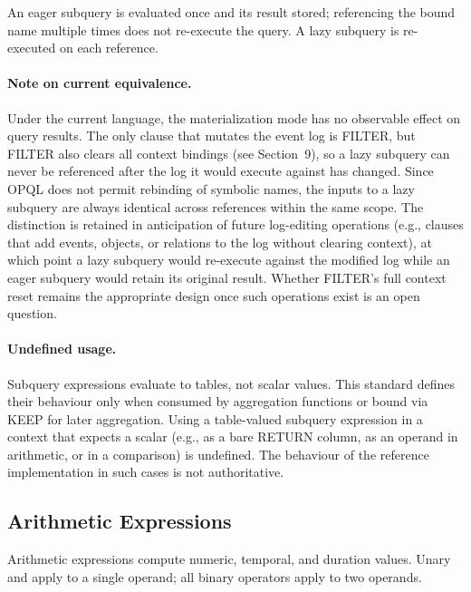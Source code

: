 An eager subquery is evaluated once and its result stored; referencing the bound name multiple times does not re-execute the query. A lazy subquery is re-executed on each reference.

\paragraph{Note on current equivalence.} Under the current language, the materialization mode has no observable effect on query results. The only clause that mutates the event log is FILTER, but FILTER also clears all context bindings (see Section~9), so a lazy subquery can never be referenced after the log it would execute against has changed. Since OPQL does not permit rebinding of symbolic names, the inputs to a lazy subquery are always identical across references within the same scope. The distinction is retained in anticipation of future log-editing operations (e.g., clauses that add events, objects, or relations to the log without clearing context), at which point a lazy subquery would re-execute against the modified log while an eager subquery would retain its original result. Whether FILTER's full context reset remains the appropriate design once such operations exist is an open question.

\paragraph{Undefined usage.} Subquery expressions evaluate to tables, not scalar values. This standard defines their behaviour only when consumed by aggregation functions or bound via KEEP for later aggregation. Using a table-valued subquery expression in a context that expects a scalar (e.g., as a bare RETURN column, as an operand in arithmetic, or in a comparison) is undefined. The behaviour of the reference implementation in such cases is not authoritative.

\subsection{Arithmetic Expressions}

Arithmetic expressions compute numeric, temporal, and duration values. Unary \term{+} and \term{-} apply to a single operand; all binary operators apply to two operands.

